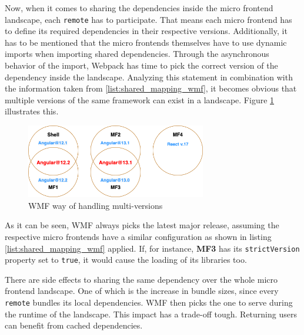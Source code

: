 Now, when it comes to sharing the dependencies inside the micro frontend landscape, each \texttt{remote} has to participate. That means each micro frontend has to define its required dependencies in their respective versions. Additionally, it has to be mentioned that the micro frontends themselves have to use dynamic imports when importing shared dependencies. Through the asynchronous behavior of the import, Webpack has time to pick the correct version of the dependency inside the landscape.\cite{wmf_concepts}
Analyzing this statement in combination with the information taken from \ref{list:shared_mapping_wmf}, it becomes obvious that multiple versions of the same framework can exist in a landscape. Figure \ref{fig:wmf_multiversions} illustrates this.

\begin{figure}[!h]
	\centering
	\includegraphics[width=0.7\textwidth]{Figures/multi_version_diagramm.drawio.png}
	\caption{WMF way of handling multi-versions}
	\label{fig:wmf_multiversions}
\end{figure}

As it can be seen, WMF always picks the latest major release, assuming the respective micro frontends have a similar configuration as shown in listing \ref{list:shared_mapping_wmf} applied. If, for instance, \textbf{MF3} has its \texttt{strictVersion} property set to \texttt{true}, it would cause the loading of its libraries too.

There are side effects to sharing the same dependency over the whole micro frontend landscape. One of which is the increase in bundle sizes, since every \texttt{remote} bundles its local dependencies. WMF then picks the one to serve during the runtime of the landscape.
This impact has a trade-off tough. Returning users can benefit from cached dependencies.\cite{wmf_multi_versions}
 
